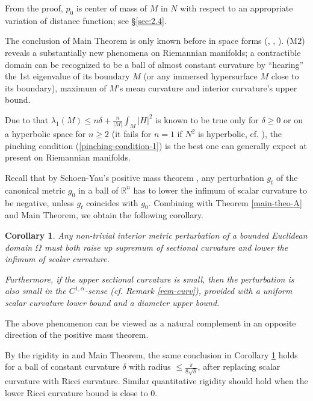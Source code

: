 \documentclass{amsart}
\numberwithin{equation}{section}
\newtheorem{cor}[theo]{Corollary}
\theoremstyle{remark}
\renewcommand{\(}{\left(}
\renewcommand{\)}{\right)}
\renewcommand{\~}{\tilde}
\renewcommand{\-}{\overline}
\renewcommand{\d}{\delta}
\renewcommand{\l}{\lambda}
\begin{document}
From the proof, $p_0$ is center of mass of $M$ in $N$ with respect to an appropriate variation of distance function; see \S \ref{sec:2.4}.

The conclusion of Main Theorem is only known before in space forms (\cite{Colbois-Grosjean2007}, \cite{Aubry-Grosjean},  \cite{Hu-Xu2017}).
(M2) reveals a substantially new phenomena on Riemannian manifolds; a contractible domain can be recognized to be a ball of almost constant curvature by ``hearing'' the 1st eigenvalue of its boundary $M$ (or any immersed hypersurface $M$ close to its boundary), maximum of $M$'s mean curvature and interior curvature's upper bound.

Due to that $\l_1(M)\le n\d+\frac{n}{|M|}\int_{M}|H|^2$ is known to be true only for $\d\ge 0$ \cite{Heintze1988} or on a hyperbolic space for $n\ge 2$ \cite{Soufi-Ilias1992} (it fails for $n=1$ if $N^2$ is hyperbolic, cf. \cite{Heintze1988}), the pinching condition (\ref{pinching-condition-1}) is the best one can generally expect at present on Riemannian manifolds.

Recall that by Schoen-Yau's positive mass theorem \cite{Schoen-Yau1979,Schoen-Yau2017}, any perturbation $g_t$ of the canonical metric $g_0$ in a ball of $\mathbb R^n$ has to lower the infimum of scalar curvature to be negative, unless $g_t$ coincides with $g_0$. 
Combining with Theorem \ref{main-theo-A} and Main Theorem, we obtain the following corollary.

\begin{cor}\label{cor-main}
	Any non-trivial interior metric perturbation of a bounded Euclidean domain $\Omega$ must both raise up supremum of sectional curvature and lower the infimum of scalar curvature. 
	
	Furthermore, if the upper sectional curvature is small, then the perturbation is also small in the $C^{1,\alpha}$-sense (cf. Remark \ref{rem-curv}), provided with a uniform scalar curvature lower bound and a diameter upper bound. 
\end{cor}

The above phenomenon can be viewed as a natural complement in an opposite direction of the positive mass theorem.

By the rigidity in \cite{Miao-Wang2016} and Main Theorem, the same conclusion in Corollary \ref{cor-main} holds for a ball of constant curvature $\d$ with radius $\le \frac{\pi}{8\sqrt{\d}}$, after replacing scalar curvature with Ricci curvature. Similar quantitative rigidity should hold when the lower Ricci curvature bound is close to $0$.
\end{document}
